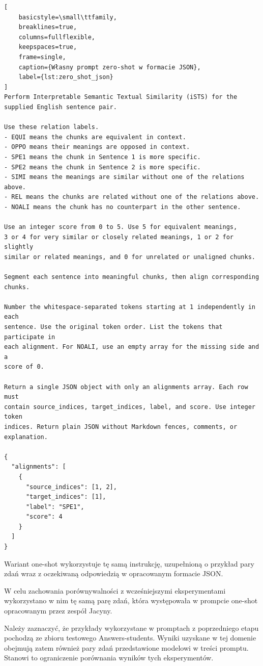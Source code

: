\documentclass[a4paper,10pt]{article}
\begin{document}
\begin{lstlisting}[
    basicstyle=\small\ttfamily,
    breaklines=true,
    columns=fullflexible,
    keepspaces=true,
    frame=single,
    caption={Własny prompt zero-shot w formacie JSON},
    label={lst:zero_shot_json}
]
Perform Interpretable Semantic Textual Similarity (iSTS) for the supplied English sentence pair.

Use these relation labels.
- EQUI means the chunks are equivalent in context.
- OPPO means their meanings are opposed in context.
- SPE1 means the chunk in Sentence 1 is more specific.
- SPE2 means the chunk in Sentence 2 is more specific.
- SIMI means the meanings are similar without one of the relations above.
- REL means the chunks are related without one of the relations above.
- NOALI means the chunk has no counterpart in the other sentence.

Use an integer score from 0 to 5. Use 5 for equivalent meanings,
3 or 4 for very similar or closely related meanings, 1 or 2 for slightly
similar or related meanings, and 0 for unrelated or unaligned chunks.

Segment each sentence into meaningful chunks, then align corresponding chunks.

Number the whitespace-separated tokens starting at 1 independently in each
sentence. Use the original token order. List the tokens that participate in
each alignment. For NOALI, use an empty array for the missing side and a
score of 0.

Return a single JSON object with only an alignments array. Each row must
contain source_indices, target_indices, label, and score. Use integer token
indices. Return plain JSON without Markdown fences, comments, or explanation.

{
  "alignments": [
    {
      "source_indices": [1, 2],
      "target_indices": [1],
      "label": "SPE1",
      "score": 4
    }
  ]
}
\end{lstlisting}

Wariant one-shot wykorzystuje tę samą instrukcję,
uzupełnioną o przykład pary zdań wraz z oczekiwaną
odpowiedzią w opracowanym formacie JSON.

W celu zachowania porównywalności z wcześniejszymi
eksperymentami wykorzystano w nim tę samą parę zdań,
która występowała w prompcie one-shot opracowanym
przez zespół Jacyny.

Należy zaznaczyć, że przykłady wykorzystane w promptach
z poprzedniego etapu pochodzą ze zbioru testowego
Answers-students. Wyniki uzyskane w tej domenie
obejmują zatem również pary zdań przedstawione modelowi
w treści promptu. Stanowi to ograniczenie porównania
wyników tych eksperymentów.
\end{document}
